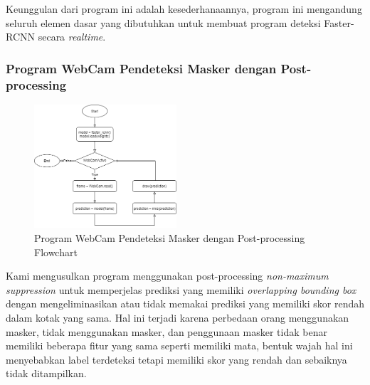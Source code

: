 \documentclass{article}
\begin{document}
	\par Keunggulan dari program ini adalah kesederhanaannya, program ini mengandung seluruh elemen dasar yang dibutuhkan untuk membuat program deteksi Faster-RCNN secara \textit{realtime}.
  	\subsubsection{Program WebCam Pendeteksi Masker dengan Post-processing}
  	\begin{figure}[H]
  		\centering
  		\includegraphics[width=200px]{arsitektur/Sequential with Postprocessing.png}
  		\caption{Program WebCam Pendeteksi Masker dengan Post-processing Flowchart}
	\end{figure}
	
	Kami mengusulkan program menggunakan post-processing \textit{non-maximum suppression} untuk memperjelas prediksi yang memiliki \textit{overlapping bounding box} dengan mengeliminasikan atau tidak memakai prediksi yang memiliki skor rendah dalam kotak yang sama. Hal ini terjadi karena perbedaan orang menggunakan masker, tidak menggunakan masker, dan penggunaan masker tidak benar memiliki beberapa fitur yang sama seperti memiliki mata, bentuk wajah hal ini menyebabkan label terdeteksi tetapi memiliki skor yang rendah dan sebaiknya tidak ditampilkan.\\
\end{document}
